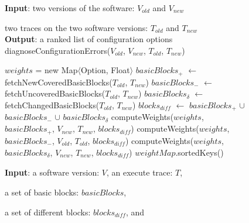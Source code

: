 \begin{figure}[t]
\textbf{Input}: two versions of the software: $\mathit{V_{old}}$ and $V_{new}$

\quad two traces on the two software versions: $\mathit{T_{old}}$ and $T_{new}$\\
\textbf{Output}: a ranked list of configuration options\\
\vspace{-4mm}%
diagnoseConfigurationErrors($\mathit{V_{old}}$, $\mathit{V_{new}}$, $\mathit{T_{old}}$, $\mathit{T_{new}}$)\\
\begin{algorithmic}[1]
\STATE $\mathit{weights}$ = new Map$\langle$Option, Float$\rangle$
\STATE $\mathit{basicBlocks_{+}}$ $\leftarrow$ fetchNewCoveredBasicBlocks($T_{old}$, $T_{new}$)
\STATE $\mathit{basicBlocks_{-}}$ $\leftarrow$ fetchUncoveredBasicBlocks($T_{old}$, $T_{new}$)
\STATE $\mathit{basicBlocks_{\delta}}$ $\leftarrow$ fetchChangedBasicBlocks($T_{old}$, $T_{new}$)
\STATE $\mathit{blocks_{diff}}$ $\leftarrow$ $\mathit{basicBlocks_{+}}$ $\cup$ $\mathit{basicBlocks_{-}}$ $\cup$ $\mathit{basicBlocks_{\delta}}$
\STATE computeWeights($\mathit{weights}$, $\mathit{basicBlocks_{+}}$, $\mathit{V_{new}}$, $\mathit{T_{new}}$, $\mathit{blocks_{diff}}$)
\STATE computeWeights($\mathit{weights}$, $\mathit{basicBlocks_{-}}$, $\mathit{V_{old}}$, $\mathit{T_{old}}$, $\mathit{blocks_{diff}}$)
\STATE computeWeights($\mathit{weights}$, $\mathit{basicBlocks_{\delta}}$, $\mathit{V_{new}}$, $\mathit{T_{new}}$, $\mathit{blocks_{diff}}$)
\RETURN $\mathit{weightMap}$.sortedKeys()
\end{algorithmic}

\vspace{2mm}

\textbf{Input}: a software version: $\mathit{V}$, an execute trace: $\mathit{T}$, 

\quad a set of basic blocks: $\mathit{basicBlocks}$, 

\quad a set of different blocks: $\mathit{blocks_{diff}}$, and


\end{figure}
